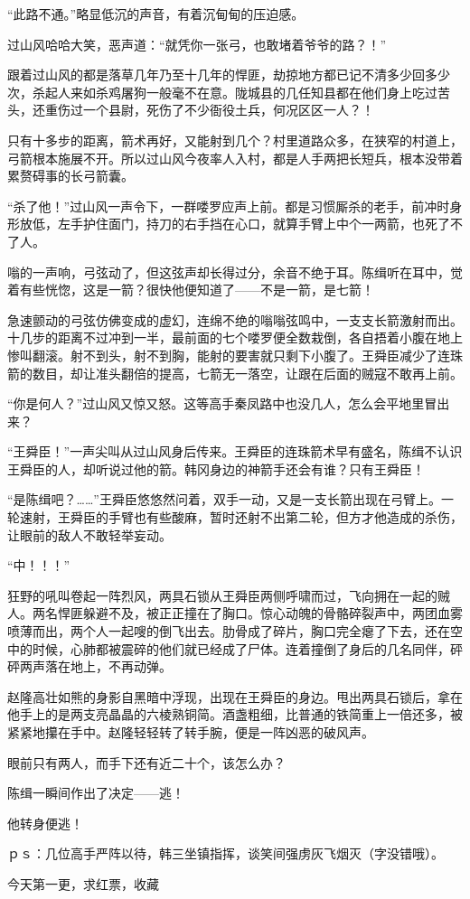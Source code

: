 “此路不通。”略显低沉的声音，有着沉甸甸的压迫感。

过山风哈哈大笑，恶声道：“就凭你一张弓，也敢堵着爷爷的路？！”

跟着过山风的都是落草几年乃至十几年的悍匪，劫掠地方都已记不清多少回多少次，杀起人来如杀鸡屠狗一般毫不在意。陇城县的几任知县都在他们身上吃过苦头，还重伤过一个县尉，死伤了不少衙役土兵，何况区区一人？！

只有十多步的距离，箭术再好，又能射到几个？村里道路众多，在狭窄的村道上，弓箭根本施展不开。所以过山风今夜率人入村，都是人手两把长短兵，根本没带着累赘碍事的长弓箭囊。

“杀了他！”过山风一声令下，一群喽罗应声上前。都是习惯厮杀的老手，前冲时身形放低，左手护住面门，持刀的右手挡在心口，就算手臂上中个一两箭，也死了不了人。

嗡的一声响，弓弦动了，但这弦声却长得过分，余音不绝于耳。陈缉听在耳中，觉着有些恍惚，这是一箭？很快他便知道了——不是一箭，是七箭！

急速颤动的弓弦仿佛变成的虚幻，连绵不绝的嗡嗡弦鸣中，一支支长箭激射而出。十几步的距离不过冲到一半，最前面的七个喽罗便全数栽倒，各自捂着小腹在地上惨叫翻滚。射不到头，射不到胸，能射的要害就只剩下小腹了。王舜臣减少了连珠箭的数目，却让准头翻倍的提高，七箭无一落空，让跟在后面的贼寇不敢再上前。

“你是何人？”过山风又惊又怒。这等高手秦凤路中也没几人，怎么会平地里冒出来？

“王舜臣！”一声尖叫从过山风身后传来。王舜臣的连珠箭术早有盛名，陈缉不认识王舜臣的人，却听说过他的箭。韩冈身边的神箭手还会有谁？只有王舜臣！

“是陈缉吧？……”王舜臣悠悠然问着，双手一动，又是一支长箭出现在弓臂上。一轮速射，王舜臣的手臂也有些酸麻，暂时还射不出第二轮，但方才他造成的杀伤，让眼前的敌人不敢轻举妄动。

“中！！！”

狂野的吼叫卷起一阵烈风，两具石锁从王舜臣两侧呼啸而过，飞向拥在一起的贼人。两名悍匪躲避不及，被正正撞在了胸口。惊心动魄的骨骼碎裂声中，两团血雾喷薄而出，两个人一起嗖的倒飞出去。肋骨成了碎片，胸口完全瘪了下去，还在空中的时候，心肺都被震碎的他们就已经成了尸体。连着撞倒了身后的几名同伴，砰砰两声落在地上，不再动弹。

赵隆高壮如熊的身影自黑暗中浮现，出现在王舜臣的身边。甩出两具石锁后，拿在他手上的是两支亮晶晶的六棱熟铜简。酒盏粗细，比普通的铁简重上一倍还多，被紧紧地攥在手中。赵隆轻轻转了转手腕，便是一阵凶恶的破风声。

眼前只有两人，而手下还有近二十个，该怎么办？

陈缉一瞬间作出了决定——逃！

他转身便逃！

ｐｓ：几位高手严阵以待，韩三坐镇指挥，谈笑间强虏灰飞烟灭（字没错哦）。

今天第一更，求红票，收藏

